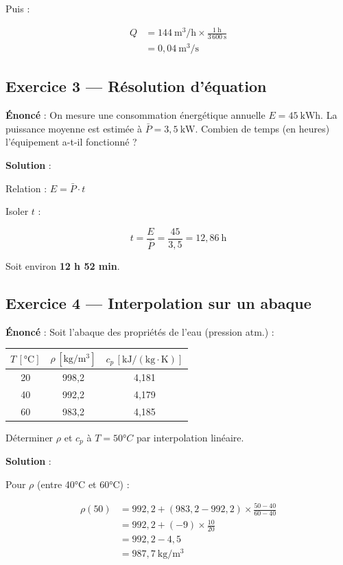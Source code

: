 Puis :

\begin{align*}
  Q &= 144~\mathrm{m^3/h} \times \frac{1~\mathrm{h}}{3\,600~\mathrm{s}} \\
  &= 0{,}04~\mathrm{m^3/s}
\end{align*}

\subsection*{Exercice 3 — Résolution d'équation}

\textbf{Énoncé} : On mesure une consommation énergétique annuelle $E = 45~\mathrm{kWh}$. La
puissance moyenne est estimée à $\bar{P} = 3{,}5~\mathrm{kW}$. Combien de temps (en heures)
l'équipement a-t-il fonctionné ?

\textbf{Solution} :

Relation : $E = \bar{P} \cdot t$

Isoler $t$ :

\[
  t = \frac{E}{\bar{P}} = \frac{45}{3{,}5} = 12{,}86~\mathrm{h}
\]

Soit environ \textbf{12 h 52 min}.

\subsection*{Exercice 4 — Interpolation sur un abaque}

\textbf{Énoncé} : Soit l'abaque des propriétés de l'eau (pression atm.) :

\begin{center}
  \sffamily
  \begin{tabular}{|c|c|c|}
    \hline
    $T\,[\mathrm{°C}]$ & $\rho\,[\mathrm{kg/m^3}]$ & $c_p\,[\mathrm{kJ/(kg \cdot K)}]$ \\
    \hline
    20 & 998{,}2 & 4{,}181 \\
    40 & 992{,}2 & 4{,}179 \\
    60 & 983{,}2 & 4{,}185 \\
    \hline
  \end{tabular}
\end{center}

Déterminer $\rho$ et $c_p$ à $T = 50°C$ par interpolation linéaire.

\textbf{Solution} :

Pour $\rho$ (entre 40°C et 60°C) :

\begin{align*}
  \rho(50) &= 992{,}2 + (983{,}2 - 992{,}2) \times \frac{50 - 40}{60 - 40} \\
  &= 992{,}2 + (-9) \times \frac{10}{20} \\
  &= 992{,}2 - 4{,}5 \\
  &= 987{,}7~\mathrm{kg/m^3}
\end{align*}

